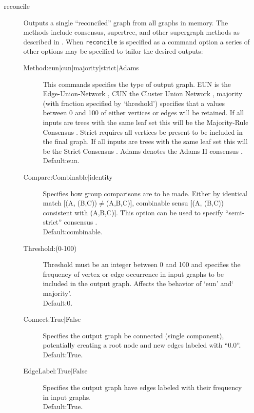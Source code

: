 \begin{description}
		\item[reconcile] Outputs a single ``reconciled'' graph from all graphs in memory. The 
		methods include consensus, supertree, and other supergraph methods as described in 
		\cite{Wheeler2012, Wheeler2022}. When \texttt{reconcile} is specified as a command 
		option a series of other options may be specified to tailor the desired outputs:
			\begin{description}
			\item [Method:eun$\mid$cun$\mid$majority$\mid$strict$\mid$Adams] 
			This commands specifies the type of output graph. EUN is the Edge-Union-Network 
			\citep{MiyagiandWheeler2019}, CUN the Cluster Union Network \citep{Baroni2005},
			majority (with fraction specified by `threshold') specifies that a values between 0 and 
			100 of either vertices or edges will be retained. If all inputs are trees with the same leaf 
			set this will be the Majority-Rule Consensus \citep{MargushandMcMorris1981}.
			Strict requires all vertices be present to be included in the final graph. If all inputs are 
			trees with the same leaf set this will be the Strict Consensus \citep{Schuhandpolhemus1980}. 
			Adams denotes the Adams II consensus \citep{Adams1972}.\\
			Default:eun.
							
			\item [Compare:Combinable$\mid$identity] Specifies how group 
			comparisons are to be made. Either by identical match [(A, (B,C))$\neq$(A,B,C)],
			combinable sensu \cite{Nelson1979} [(A, (B,C)) consistent with (A,B,C)]. This option 
			can be used to specify ``semi-strict'' consensus \citep{Bremer1990}.\\
			Default:combinable.
							
			\item [Threshold:(0-100)] Threshold must be an integer between 0 and 100 
			and specifies the frequency of vertex or edge occurrence in input graphs to be included 
			in the output graph. Affects the behavior of `eun' and` majority'.\\
			Default:0.
			
			\item [Connect:True$\mid$False] Specifies the output graph be connected 
			(single component), potentially creating a root node and new edges labeled with ``0.0''.\\
			Default:True.
			
			\item [EdgeLabel:True$\mid$False] Specifies the output graph have edges 
			labeled with their frequency in input graphs. \\
			Default:True.
			

\end{description}
\end{description}
